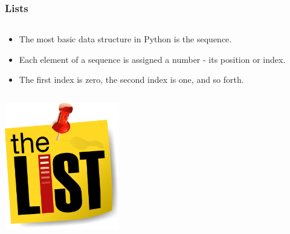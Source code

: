 \documentclass{beamer}
\begin{document}
\begin{frame}
	\frametitle{Lists}
	\begin{columns}[c]
		\begin{column}{30cm}
			\vspace{.1cm}
			\begin{itemize}
				\justifying
				\item The most basic data structure in Python is the sequence.
				\item Each element of a sequence is assigned a number - its position or index.
				\item The first index is zero, the second index is one, and so forth.
			\end{itemize}
		\end{column}
	\end{columns}
	\vspace{.5cm}
	\hspace*{5.5cm} \includegraphics[width=5cm]{figs/list.jpg}	
\end{frame}
\end{document}
